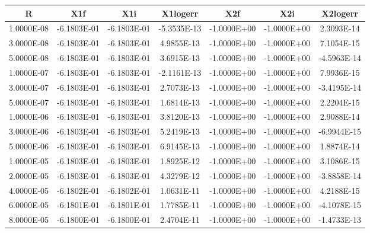 \documentclass[12pt,letterpaper,reqno]{article}
\numberwithin{equation}{section}
\begin{document}
{
\tiny
\begin{tabular}{|c|c|c|c|c|c|c|}
\hline
      R         &      X1f        &      X1i        &    X1logerr     &      X2f        &      X2i        &    X2logerr    \\ 
\hline
 1.0000E-08     & -6.1803E-01     & -6.1803E-01     & -5.3535E-13     & -1.0000E+00     & -1.0000E+00     &  2.3093E-14    \\ 
 3.0000E-08     & -6.1803E-01     & -6.1803E-01     &  4.9855E-13     & -1.0000E+00     & -1.0000E+00     &  7.1054E-15    \\ 
 5.0000E-08     & -6.1803E-01     & -6.1803E-01     &  3.6915E-13     & -1.0000E+00     & -1.0000E+00     & -4.5963E-14    \\ 
 1.0000E-07     & -6.1803E-01     & -6.1803E-01     & -2.1161E-13     & -1.0000E+00     & -1.0000E+00     &  7.9936E-15    \\ 
 3.0000E-07     & -6.1803E-01     & -6.1803E-01     &  2.7073E-13     & -1.0000E+00     & -1.0000E+00     & -3.4195E-14    \\ 
 5.0000E-07     & -6.1803E-01     & -6.1803E-01     &  1.6814E-13     & -1.0000E+00     & -1.0000E+00     &  2.2204E-15    \\ 
 1.0000E-06     & -6.1803E-01     & -6.1803E-01     &  3.8120E-13     & -1.0000E+00     & -1.0000E+00     &  2.9088E-14    \\ 
 3.0000E-06     & -6.1803E-01     & -6.1803E-01     &  5.2419E-13     & -1.0000E+00     & -1.0000E+00     & -6.9944E-15    \\ 
 5.0000E-06     & -6.1803E-01     & -6.1803E-01     &  6.9145E-13     & -1.0000E+00     & -1.0000E+00     &  1.8874E-14    \\ 
 1.0000E-05     & -6.1803E-01     & -6.1803E-01     &  1.8925E-12     & -1.0000E+00     & -1.0000E+00     &  3.1086E-15    \\ 
 2.0000E-05     & -6.1803E-01     & -6.1803E-01     &  4.3279E-12     & -1.0000E+00     & -1.0000E+00     & -3.8858E-14    \\ 
 4.0000E-05     & -6.1802E-01     & -6.1802E-01     &  1.0631E-11     & -1.0000E+00     & -1.0000E+00     &  4.2188E-15    \\ 
 6.0000E-05     & -6.1801E-01     & -6.1801E-01     &  1.7785E-11     & -1.0000E+00     & -1.0000E+00     & -4.1078E-15    \\ 
 8.0000E-05     & -6.1800E-01     & -6.1800E-01     &  2.4704E-11     & -1.0000E+00     & -1.0000E+00     & -1.4733E-13    \\ 

\end{tabular}}
\end{document}
